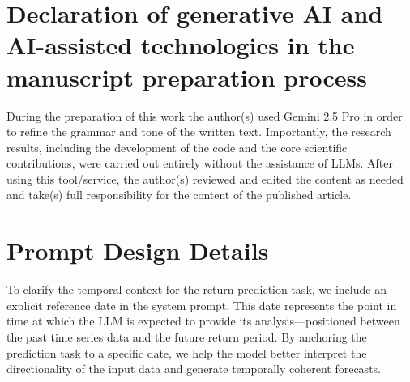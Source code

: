 

\section*{Declaration of generative AI and AI-assisted technologies in the manuscript preparation process}
During the preparation of this work the author(s) used Gemini 2.5 Pro in order to refine the grammar and tone of the written text. Importantly, the research results, including the development of the code and the core scientific contributions, were carried out entirely without the assistance of LLMs. After using this tool/service, the author(s) reviewed and edited the content as needed and take(s) full responsibility for the content of the published article.

\section{Prompt Design Details} \label{appendix:prompts}

To clarify the temporal context for the return prediction task, we include an explicit reference date in the system prompt. This date represents the point in time at which the LLM is expected to provide its analysis—positioned between the past time series data and the future return period. By anchoring the prediction task to a specific date, we help the model better interpret the directionality of the input data and generate temporally coherent forecasts.

